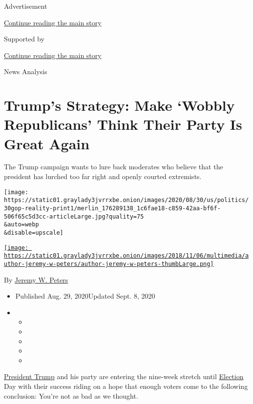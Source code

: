 Advertisement

\protect\hyperlink{after-top}{Continue reading the main story}

Supported by

\protect\hyperlink{after-sponsor}{Continue reading the main story}

News Analysis

\hypertarget{trumps-strategy-make-wobbly-republicans-think-their-party-is-great-again}{%
\section{Trump's Strategy: Make `Wobbly Republicans' Think Their Party
Is Great
Again}\label{trumps-strategy-make-wobbly-republicans-think-their-party-is-great-again}}

The Trump campaign wants to lure back moderates who believe that the
president has lurched too far right and openly courted extremists.

\texttt{[image: https://static01.graylady3jvrrxbe.onion/images/2020/08/30/us/politics/30gop-reality-print1/merlin\_176289138\_1c6fae18-c859-42aa-bf6f-506f65c5d3cc-articleLarge.jpg?quality=75\\\&auto=webp\\\&disable=upscale]}

\href{https://www.nytimes3xbfgragh.onion/by/jeremy-w-peters}{\texttt{[image: https://static01.graylady3jvrrxbe.onion/images/2018/11/06/multimedia/author-jeremy-w-peters/author-jeremy-w-peters-thumbLarge.png]}}

By \href{https://www.nytimes3xbfgragh.onion/by/jeremy-w-peters}{Jeremy
W. Peters}

\begin{itemize}
\item
  Published Aug. 29, 2020Updated Sept. 8, 2020
\item
  \begin{itemize}
  \item
  \item
  \item
  \item
  \item
  \end{itemize}
\end{itemize}

\href{https://www.nytimes3xbfgragh.onion/2020/09/01/us/politics/trump-republicans.html}{President
Trump} and his party are entering the nine-week stretch until
\href{https://www.nytimes3xbfgragh.onion/live/2020/08/31/us/trump-vs-biden}{Election}
Day with their success riding on a hope that enough voters come to the
following conclusion: You're not as bad as we thought.

